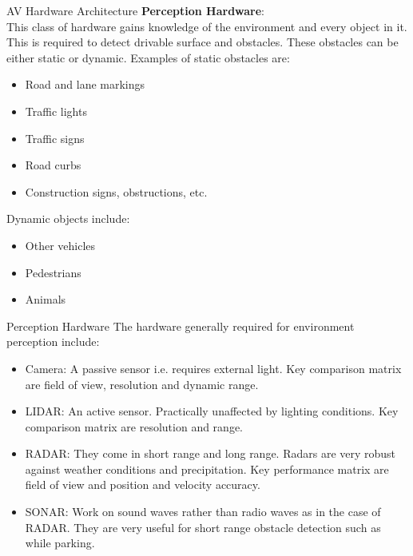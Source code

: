 \documentclass{beamer}
\begin{document}
\begin{frame}{AV Hardware Architecture}
    \textbf{Perception Hardware}:\\
    This class of hardware gains knowledge of the environment and every object in it. This is required to detect drivable surface and obstacles. These obstacles can be either static or dynamic. Examples of static obstacles are: 
    \begin{itemize}
        \item Road and lane markings
        \item Traffic lights
        \item Traffic signs
        \item Road curbs
        \item Construction signs, obstructions, etc.
    \end{itemize}
    Dynamic objects include:
    \begin{itemize}
        \item Other vehicles
        \item Pedestrians
        \item Animals
    \end{itemize}
\end{frame}

\begin{frame}{Perception Hardware}
    The hardware generally required for environment perception include:
    \begin{itemize}
        \item Camera: A passive sensor i.e. requires external light. Key comparison matrix are field of view, resolution and dynamic range.
        \item LIDAR: An active sensor. Practically unaffected by lighting conditions. Key comparison matrix are resolution and range.
        \item RADAR: They come in short range and long range. Radars are very robust against weather conditions and precipitation. Key performance matrix are field of view and position and velocity accuracy.
        \item SONAR: Work on sound waves rather than radio waves as in the case of RADAR. They are very useful for short range obstacle detection such as while parking.
    \end{itemize}
\end{frame}
\end{document}
